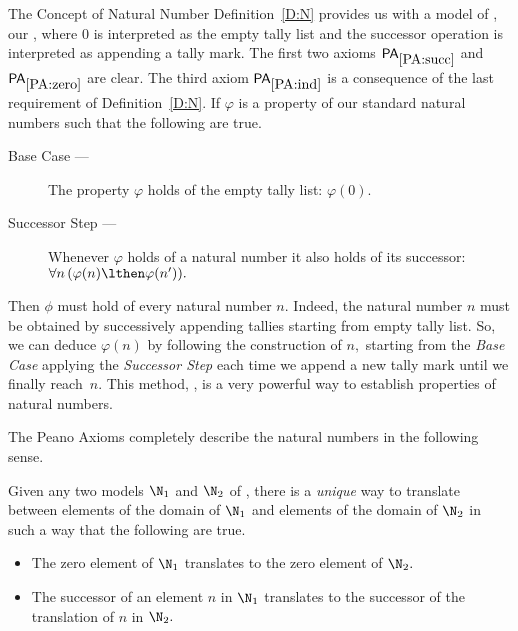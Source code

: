 \begin{unit}{The Concept of Natural Number}
Definition~\ref{D:N} provides us with a model of \PA, our , where \(0\) is interpreted as the empty tally list and the successor operation is interpreted as appending a tally mark.
The first two axioms \(\pax{succ}\) and \(\pax{zero}\) are clear.
The third axiom \(\pax{ind}\) is a consequence of the last requirement of Definition~\ref{D:N}.
If \(\varphi\) is a property of our standard natural numbers such that the following are true.
\begin{description}
\item[Base Case ---] The property \(\varphi\) holds of the empty tally list: \(\varphi(0).\)
\item[Successor Step ---] Whenever \(\varphi\) holds of a natural number it also holds of its successor: \(\forall n\,(\varphi(n) \lthen \varphi(n')).\)
\end{description}
Then \(\phi\) must hold of every natural number \(n.\)
Indeed, the natural number \(n\) must be obtained by successively appending tallies starting from empty tally list.
So, we can deduce \(\varphi(n)\) by following the construction of \(n,\) starting from the \emph{Base Case} applying the \emph{Successor Step} each time we append a new tally mark until we finally reach~\(n.\) 
This method, , is a very powerful way to establish properties of natural numbers.

The Peano Axioms completely describe the natural numbers in the following sense.

\begin{theorem}\label{T:PeanoCategoricity}
  Given any two models \(\N_1\) and \(\N_2\) of \PA, there is a \emph{unique} way to translate between elements of the domain of \(\N_1\) and elements of the domain of \(\N_2\) in such a way that the following are true.
  \begin{itemize}
  \item The zero element of \(\N_1\) translates to the zero element of \(\N_2.\)
  \item The successor of an element \(n\) in \(\N_1\) translates to the successor of the translation of \(n\) in \(\N_2.\)
  \end{itemize}
\end{theorem}


\end{unit}
